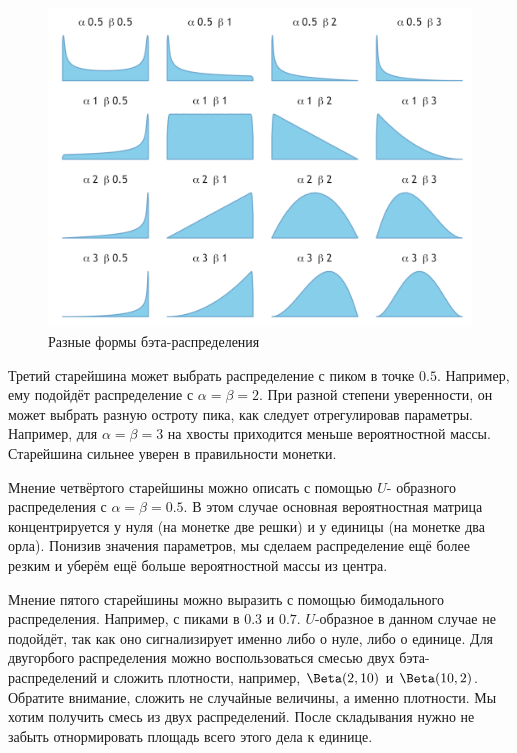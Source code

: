 \documentclass[12pt, a4paper, oneside]{extreport}
\theoremstyle{plain}              %
\theoremstyle{definition}         %
\begin{document}
\begin{figure}[t]
\begin{center}
	\includegraphics[scale=0.6]{beta.png}
\end{center} 
\caption{Разные формы бэта-распределения}  \label{beta_dist} 
\end{figure} 

Третий старейшина может выбрать распределение с пиком в точке $0.5$.   Например, ему подойдёт распределение с $\alpha = \beta = 2$. При разной степени уверенности, он может выбрать разную остроту пика, как следует отрегулировав параметры. Например, для $\alpha = \beta = 3$ на хвосты приходится меньше вероятностной массы. Старейшина сильнее уверен в правильности монетки. 

Мнение четвёртого старейшины можно описать с помощью $U$- образного распределения с $\alpha = \beta = 0.5$. В этом случае основная вероятностная матрица концентрируется у нуля (на монетке две решки) и у единицы (на монетке два орла). Понизив значения параметров, мы сделаем распределение ещё более резким и уберём ещё больше вероятностной массы из центра.

Мнение пятого старейшины можно выразить с помощью бимодального распределения. Например, с пиками в $0.3$ и $0.7$. $U$-образное в данном случае не подойдёт, так как оно сигнализирует именно либо о нуле, либо о единице. Для двугорбого распределения можно воспользоваться смесью двух бэта-распределений и сложить плотности, например, $\Beta(2,10)$ и $\Beta(10,2)$. Обратите внимание, сложить не случайные величины, а именно плотности. Мы хотим получить смесь из двух распределений. После складывания нужно не забыть отнормировать площадь всего этого дела к единице. 
\end{document}
